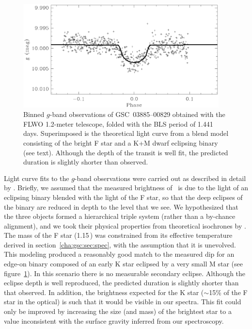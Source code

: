 \begin{figure}
\begin{center}
\includegraphics[width=0.95\textwidth]{3_f5}
\caption[$g$-band observations modeled as an F/K+M blend]{Binned $g$-band observations of \mbox{GSC 03885--00829}
  obtained with the FLWO 1.2-meter telescope, folded with the BLS period
  of 1.441 days. Superimposed is the theoretical light curve from a
  blend model consisting of the bright F star and a K+M dwarf
  eclipsing binary (see text). Although the depth of the transit is
  well fit, the predicted duration is slightly shorter than observed.}\label{cha:gsc:fig:KMmodel}
\end{center}
\end{figure}


Light curve fits to the $g$-band observations were carried out as
described in detail by \citet{Torres_Konacki_Sasselov:apj:2004b}.
Briefly, we assumed that the
measured brightness of \gscOTE\ is due to the light of an eclipsing
binary blended with the light of the F star, so that the deep eclipses
of the binary are reduced in depth to the level that we see. We
hypothesized that the three objects formed a hierarchical triple
system (rather than a by-chance alignment), and we took their
physical properties from theoretical isochrones by
\citet{Girardi_Bressan_Bertelli:aas:2000a}. The mass of the F star
(1.15\,\msun) was constrained from its effective temperature
derived in section~\ref{cha:gsc:sec:spec}, with the assumption that it is unevolved.
This modeling produced a reasonably good match to the measured dip for
an edge-on binary composed of an early K star eclipsed by a very
small M star (see figure~\ref{cha:gsc:fig:KMmodel}).  In this scenario there
is no measurable secondary eclipse.  Although the eclipse depth is
well reproduced, the predicted duration is slightly shorter than that
observed.  In addition, the brightness expected for the K star
($\sim$15\% of the F star in the optical) is such that it would be
visible in our spectra.  This fit could only be improved by increasing
the size (and mass) of the brightest star to a value inconsistent with
the surface gravity inferred from our spectroscopy.

